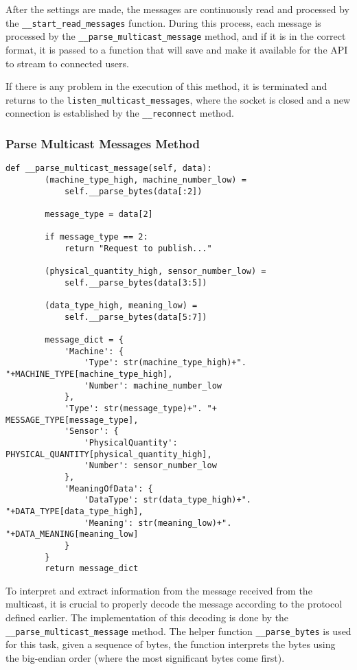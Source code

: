 After the settings are made, the messages are continuously read and processed by the \texttt{\_\_start\_read\_messages} function. During this process, each message is processed by the \texttt{\_\_parse\_multicast\_message} method, and if it is in the correct format, it is passed to a function that will save and make it available for the \gls{API} to stream to connected users.

If there is any problem in the execution of this method, it is terminated and returns to the \texttt{listen\_multicast\_messages}, where the socket is closed and a new connection is established by the \texttt{\_\_reconnect} method.

\subsubsection[Parse Multicast Messages Method]{Parse Multicast Messages Method}

\begin{Verbatim}[fontsize=\small, baselinestretch=0.8]
def __parse_multicast_message(self, data):
        (machine_type_high, machine_number_low) = 
            self.__parse_bytes(data[:2])

        message_type = data[2]

        if message_type == 2:
            return "Request to publish..."

        (physical_quantity_high, sensor_number_low) = 
            self.__parse_bytes(data[3:5])
        
        (data_type_high, meaning_low) = 
            self.__parse_bytes(data[5:7])

        message_dict = {
            'Machine': {
                'Type': str(machine_type_high)+". "+MACHINE_TYPE[machine_type_high],
                'Number': machine_number_low
            },
            'Type': str(message_type)+". "+ MESSAGE_TYPE[message_type],
            'Sensor': {
                'PhysicalQuantity': PHYSICAL_QUANTITY[physical_quantity_high],
                'Number': sensor_number_low
            },
            'MeaningOfData': {
                'DataType': str(data_type_high)+". "+DATA_TYPE[data_type_high],
                'Meaning': str(meaning_low)+". "+DATA_MEANING[meaning_low]
            }
        }
        return message_dict
\end{Verbatim}

To interpret and extract information from the message received from the multicast, it is crucial to properly decode the message according to the protocol defined earlier. The implementation of this decoding is done by the \texttt{\_\_parse\_multicast\_message} method. The helper function \texttt{\_\_parse\_bytes} is used for this task, given a sequence of bytes, the function interprets the bytes using the big-endian order (where the most significant bytes come first).

